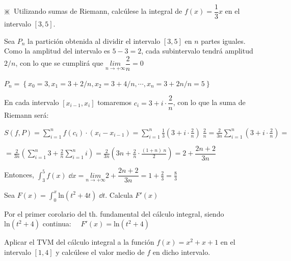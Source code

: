 \begin{ejre}
$\divideontimes \; \; $Utilizando sumas de Riemann, calcúlese la integral de $f(x)=\dfrac 1 3 x$ en el intervalo $[3,5]$.	
\end{ejre}

\begin{proofw}\renewcommand{\qedsymbol}{$\diamond$}	

 Sea $P_n$ la partición obtenida al dividir el intervalo $[3,5]$	 en $n$ partes iguales. Como la amplitud del intervalo es $5-3=2$, cada subintervalo tendrá amplitud $2/n$, con lo que se cumplirá que $\underset{n\to +\infty}{lim}{\dfrac 2 n}= 0$	

$P_n=\left\{ x_0=3, x_1=3+2/n, x_2=3+4/n, \cdots, x_n=3+2n/n=5   \right\}$

En cada intervalo $[x_{i-1}, x_i]$ tomaremos $c_i=3+i\cdot \dfrac 2 n$, con lo que la suma de Riemann será:

$S(f,P)=\displaystyle \sum _{ i=1 }^{ n }{ f(c_i) \cdot (x_i-x_{i-1}) } = \sum _{ i=1 }^{ n } {\frac 1 3 \left( 3+i\cdot \frac 2 n  \right) \; \frac 2 n} = \frac {2}{3n} \sum _{ i=1 }^{ n } {\left( 3+i\cdot \frac 2 n  \right)} =$

$= \displaystyle \frac {2}{3n} \left( \sum _{ i=1 }^{ n }{3} + \frac 2 n \sum _{ i=1 }^{ n }{i}  \right) = \frac {2}{3n} \left( 3n + \frac 2 n \cdot \frac {(1+n)\; n}{2} \right)= 2 + \dfrac {2n+2}{3n}$

Entonces, $\displaystyle \int_3^5 f(x)\; \dd x= \underset {n\to +\infty}{lim}{2+ \dfrac {2n+2}{3n}}=1+\frac 2 3 = \frac 8 3$

\end{proofw}

\begin{ejre}
Sea $\displaystyle F(x)=\int_0^x \mathrm{ln} (t^2+4t)\; \dd t$. Calcula $F'(x)$	
\end{ejre}
\begin{proofw}\renewcommand{\qedsymbol}{$\diamond$}	
	
	Por el primer corolario del th. fundamental del cálculo integral, siendo $\mathrm{ln} (t^2+4)$ continua:
	$\quad F'(x)=\mathrm{ln} (t^2+4)$
\end{proofw}



\begin{ejre}
 Aplicar el TVM del cálculo integral a la función $f(x)=x^2+x+1$ en el intervalo $[1,4]$ y calcúlese el valor medio de $f$ en dicho intervalo.
\end{ejre}

